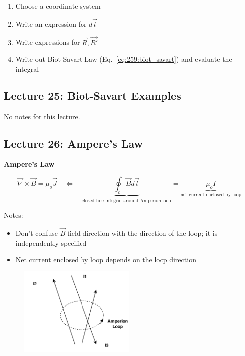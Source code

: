 \documentclass[10pt]{article}
\begin{document}
\begin{enumerate}
	\item Choose a coordinate system
	\item Write an expression for $ d \vec{l} $ 
	\item Write expressions for $ \vec{R}, \vec{R'} $ 
	\item Write out Biot-Savart Law (Eq.~\ref{eq:259:biot_savart}) and evaluate the integral
\end{enumerate}
















\subsection{Lecture 25: Biot-Savart Examples}
No notes for this lecture.


\subsection{Lecture 26: Ampere's Law}

\begin{definition}
	\textbf{Ampere's Law} 

	\begin{equation}
		\vec{\nabla} \times \vec{B} = \mu_o \vec{J} \quad \Leftrightarrow \quad \underbrace{\oint_c \vec{B}	d \vec{l}}_{\text{closed line integral around Amperion loop}} = \underbrace{\mu_o I}_{\text{net current enclosed by loop}}
		\label{eq:259:amperes_law}
	\end{equation}

	Notes:

	\begin{itemize}
		\item Don't confuse $ \vec{B} $ field direction with the direction of the loop; it is independently specified
		\item Net current enclosed by loop depends on the loop direction
	\end{itemize}

\end{definition}



\begin{figure}[H]
	\centering
	\includegraphics[width=0.5\textwidth]{img/259-amperion-loop.pdf}
\end{figure}
\end{document}
